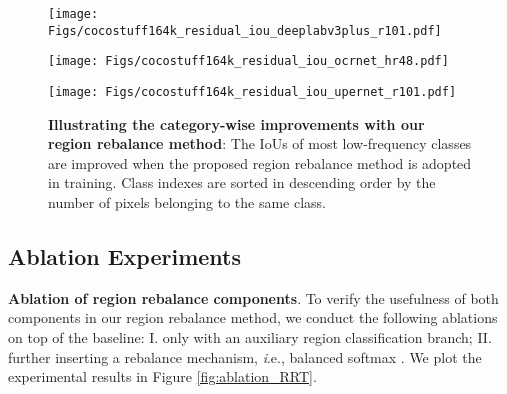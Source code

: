 \documentclass[final]{cvpr}
\begin{document}
\begin{figure*}[t]
	\begin{center}
		\begin{minipage}[t]{0.32\textwidth} 
			\begin{center}
				\texttt{[image: Figs/cocostuff164k\_residual\_iou\_deeplabv3plus\_r101.pdf]} 
				\label{fig:residual_iou_deeplabv3plus} 
			\end{center} 
		\end{minipage} 
		\hspace{0.05in}
		\begin{minipage}[t]{0.32\textwidth} 
			\begin{center}
				\texttt{[image: Figs/cocostuff164k\_residual\_iou\_ocrnet\_hr48.pdf]} 
				\label{fig:residual_iou_ocrnet} 
			\end{center} 
		\end{minipage} 
		\hspace{0.05in}
		\begin{minipage}[t]{0.32\textwidth} 
			\begin{center}
				\texttt{[image: Figs/cocostuff164k\_residual\_iou\_upernet\_r101.pdf]} 
				\label{fig:residual_iou_upernet} 
			\end{center}
		\end{minipage}
	\end{center}
	\vspace{-0.15in}
	\caption{\textbf{Illustrating the category-wise improvements with our region rebalance method}: The $\mathrm{IoU}$s of most low-frequency classes are improved when the proposed region rebalance method is adopted in training. Class indexes are sorted in descending order by the number of pixels belonging to the same class.}
	\label{fig:residual_iou_cocostuff164k}
	\vspace{-0.1in}
\end{figure*}


\subsection{Ablation Experiments}

\vspace{1mm}
\noindent\textbf{Ablation of region rebalance components}.
To verify the usefulness of both components in our region rebalance method, we conduct the following ablations on top of the baseline: I. only with an auxiliary region classification branch; II. further inserting a rebalance mechanism, {\textit i.e.}, balanced softmax \cite{DBLP:conf/nips/RenYSMZYL20}. We plot the experimental results in Figure \ref{fig:ablation_RRT}.
\end{document}
